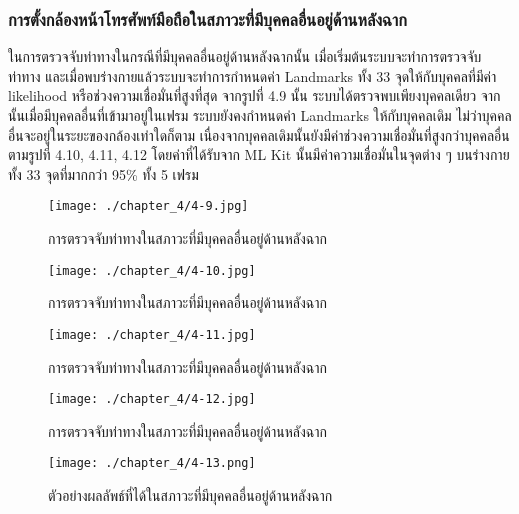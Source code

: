 \subsubsection{การตั้งกล้องหน้าโทรศัพท์มือถือในสภาวะที่มีบุคคลอื่นอยู่ด้านหลังฉาก}
ในการตรวจจับท่าทางในกรณีที่มีบุคคลอื่นอยู่ด้านหลังฉากนั้น เมื่อเริ่มต้นระบบจะทำการตรวจจับท่าทาง และเมื่อพบร่างกายแล้วระบบจะทำการกำหนดค่า Landmarks ทั้ง 33 จุดให้กับบุคคลที่มีค่า likelihood หรือช่วงความเชื่อมั่นที่สูงที่สุด จากรูปที่ 4.9 นั้น ระบบได้ตรวจพบเพียงบุคคลเดียว จากนั้นเมื่อมีบุคคลอื่นที่เข้ามาอยู่ในเฟรม ระบบยังคงกำหนดค่า Landmarks ให้กับบุคคลเดิม ไม่ว่าบุคคลอื่นจะอยู่ในระยะของกล้องเท่าใดก็ตาม เนื่องจากบุคคลเดิมนั้นยังมีค่าช่วงความเชื่อมั่นที่สูงกว่าบุคคลอื่น ตามรูปที่ 4.10, 4.11, 4.12 โดยค่าที่ได้รับจาก ML Kit นั้นมีค่าความเชื่อมั่นในจุดต่าง ๆ บนร่างกายทั้ง 33 จุดที่มากกว่า 95\% ทั้ง 5 เฟรม
\begin{figure}
	\texttt{[image: ./chapter\_4/4-9.jpg]}
	\caption{การตรวจจับท่าทางในสภาวะที่มีบุคคลอื่นอยู่ด้านหลังฉาก}
\end{figure}
\begin{figure}
	\texttt{[image: ./chapter\_4/4-10.jpg]}
	\caption{การตรวจจับท่าทางในสภาวะที่มีบุคคลอื่นอยู่ด้านหลังฉาก}
\end{figure}
\begin{figure}
	\texttt{[image: ./chapter\_4/4-11.jpg]}
	\caption{การตรวจจับท่าทางในสภาวะที่มีบุคคลอื่นอยู่ด้านหลังฉาก}
\end{figure}
\begin{figure}
	\texttt{[image: ./chapter\_4/4-12.jpg]}
	\caption{การตรวจจับท่าทางในสภาวะที่มีบุคคลอื่นอยู่ด้านหลังฉาก}
\end{figure}
\begin{figure}
	\texttt{[image: ./chapter\_4/4-13.png]}
	\caption{ตัวอย่างผลลัพธ์ที่ได้ในสภาวะที่มีบุคคลอื่นอยู่ด้านหลังฉาก}
\end{figure}

